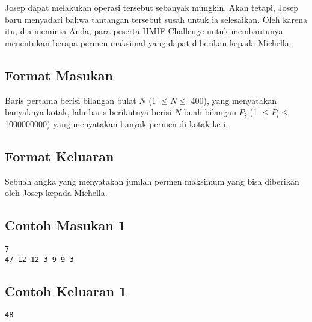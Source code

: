 \documentclass{article}
\begin{document}
Josep dapat melakukan operasi tersebut sebanyak mungkin. Akan tetapi, Josep baru menyadari bahwa tantangan tersebut susah untuk ia selesaikan. Oleh karena itu, dia meminta Anda, para peserta HMIF Challenge untuk membantunya menentukan berapa permen maksimal yang dapat diberikan kepada Michella.





\subsection*{Format Masukan}


Baris pertama berisi bilangan bulat $N$ (1 $\leq N \leq$ 400), yang menyatakan banyaknya kotak, lalu baris berikutnya berisi
$N$ buah bilangan $P_i$ (1 $\leq P_i \leq$ 1000000000) yang menyatakan banyak permen di kotak ke-i.

\subsection*{Format Keluaran}
Sebuah angka yang menyatakan jumlah permen maksimum yang bisa diberikan oleh Josep kepada Michella.
\\

\begin{multicols}{2}
\subsection*{Contoh Masukan 1}
\begin{lstlisting}
7
47 12 12 3 9 9 3
\end{lstlisting}
\columnbreak
\subsection*{Contoh Keluaran 1}
\begin{lstlisting}
48
\end{lstlisting}
\vfill
\end{multicols}
\end{document}
